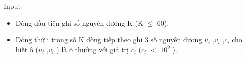 Input
\begin{itemize}
	\item Dòng đầu tiên ghi số nguyên dương K (K  $\le$  60).
	\item Dòng thứ i trong số K dòng tiếp theo ghi 3 số nguyên dương $u_{i}$ ,$v_{i}$ ,$c_{i}$ cho biết ô ($u_{i}$ ,$v_{i}$ ) là ô thưởng với giá trị $c_{i}$ ($c_{i}$ $<$ $10^{9}$ ).
\end{itemize}